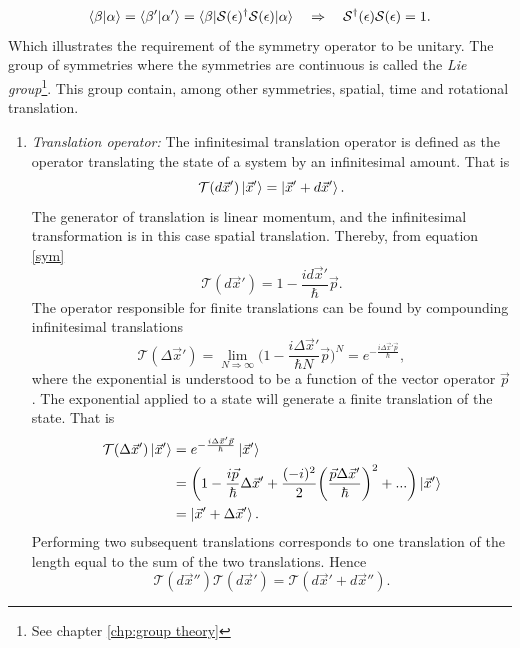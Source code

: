 \begin{equation}
	\braket{\beta|\alpha}=\braket{\beta'|\alpha'}=\braket{\beta|\mathcal{S}(\epsilon)^\dagger\mathcal{S}(\epsilon)|\alpha} \quad \Rightarrow \quad \mathcal{S}^\dagger(\epsilon)\mathcal{S}(\epsilon)=1.
\end{equation} 
Which illustrates the requirement of the symmetry operator to be unitary. The group of symmetries where the symmetries are continuous is called the \emph{Lie group}\footnote{See chapter \ref{chp:group theory}}. This group contain, among other symmetries, spatial, time and rotational translation.
\begin{enumerate}
	\item \emph{Translation operator:}\newline
	The infinitesimal translation operator is defined as the operator translating the state of a system by an infinitesimal amount. That is
	\begin{equation}
		\mathcal{T}(d\vec{x}')\ket{\vec{x}'}=\ket{\vec{x}'+d\vec{x}'}.
	\end{equation} 
	The generator of translation is linear momentum, and the infinitesimal transformation is in this case spatial translation. Thereby, from equation \eqref{sym}
	\begin{equation}
		\mathcal{T}(d\vec{x}')=1-\frac{id\vec{x}'}{\hbar}\vec{p}.
		\label{trans}
	\end{equation} 
	The operator responsible for finite translations can be found by compounding infinitesimal translations
	\begin{equation}
		\mathcal{T}(\Delta\vec{x}')=\lim\limits_{N\Rightarrow\infty}\bigg(1-\frac{i\Delta\vec{x}'}{\hbar N}\vec{p}\bigg)^N=e^{-\frac{i\Delta\vec{x}'\vec{p}}{\hbar}},
		\label{trans finit}
	\end{equation} 
	where the exponential is understood to be a function of the vector operator $\vec{p}$. The exponential applied to a state will generate a finite translation of the state. That is
	\begin{equation}
		\begin{split}
			\mathcal{T}(\Delta\vec{x}')\ket{\vec{x}'}&=e^{-\frac{i\Delta\vec{x}'\vec{p}}{\hbar}}\ket{\vec{x}'}\\
			&=\bigg(1-\frac{i\vec{p}}{\hbar}\Delta\vec{x}'+\frac{(-i)^2}{2}\bigg(\frac{\vec{p}\Delta \vec{x}'}{\hbar}\bigg)^2+...\bigg)\ket{\vec{x}'}\\
			&=\ket{\vec{x}'+\Delta\vec{x}'}.
		\end{split}
	\end{equation} 
	Performing two subsequent translations corresponds to one translation of the length equal to the sum of the two translations. Hence
	\begin{equation}
		\mathcal{T}(d\vec{x}'')\mathcal{T}(d\vec{x}')=\mathcal{T}(d\vec{x}'+d\vec{x}'').
	\end{equation} 
	

\end{enumerate}
